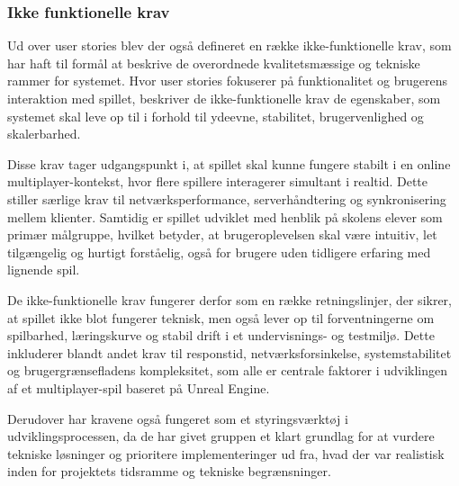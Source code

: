 \subsubsection{Ikke funktionelle krav}
Ud over user stories blev der også defineret en række ikke-funktionelle krav, som har haft til formål at beskrive de overordnede kvalitetsmæssige og tekniske rammer for systemet. Hvor user stories fokuserer på funktionalitet og brugerens interaktion med spillet, beskriver de ikke-funktionelle krav de egenskaber, som systemet skal leve op til i forhold til ydeevne, stabilitet, brugervenlighed og skalerbarhed.

Disse krav tager udgangspunkt i, at spillet skal kunne fungere stabilt i en online multiplayer-kontekst, hvor flere spillere interagerer simultant i realtid. Dette stiller særlige krav til netværksperformance, serverhåndtering og synkronisering mellem klienter. Samtidig er spillet udviklet med henblik på skolens elever som primær målgruppe, hvilket betyder, at brugeroplevelsen skal være intuitiv, let tilgængelig og hurtigt forståelig, også for brugere uden tidligere erfaring med lignende spil.

De ikke-funktionelle krav fungerer derfor som en række retningslinjer, der sikrer, at spillet ikke blot fungerer teknisk, men også lever op til forventningerne om spilbarhed, læringskurve og stabil drift i et undervisnings- og testmiljø. Dette inkluderer blandt andet krav til responstid, netværksforsinkelse, systemstabilitet og brugergrænsefladens kompleksitet, som alle er centrale faktorer i udviklingen af et multiplayer-spil baseret på Unreal Engine.

Derudover har kravene også fungeret som et styringsværktøj i udviklingsprocessen, da de har givet gruppen et klart grundlag for at vurdere tekniske løsninger og prioritere implementeringer ud fra, hvad der var realistisk inden for projektets tidsramme og tekniske begrænsninger.

